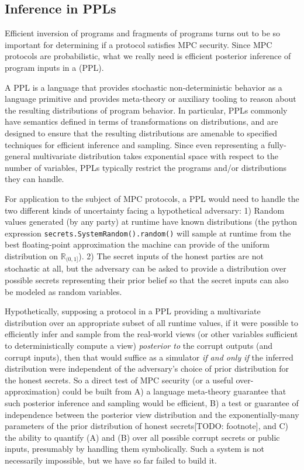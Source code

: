 \documentclass[conference]{IEEEtran}
\begin{document}
\subsection{Inference in PPLs}

Efficient inversion of programs and fragments of programs turns out to be so important for determining if a protocol satisfies MPC security.
Since MPC protocols are probabilistic, what we really need is efficient posterior inference of program inputs in a
 (PPL).

A PPL is a language that provides stochastic non-deterministic behavior as a language primitive
and provides meta-theory or auxiliary tooling to reason about the resulting distributions of program behavior.
In particular, PPLs commonly have semantics defined in terms of transformations on distributions,
and are designed to ensure that the resulting distributions are amenable to specified techniques for efficient
inference and sampling. Since even representing a fully-general multivariate distribution takes exponential space with respect to the number of variables,
PPLs typically restrict the programs and/or distributions they can handle.

For application to the subject of MPC protocols, a PPL would need to handle the two different kinds of uncertainty facing a hypothetical adversary:
1) Random values generated (by any party) at runtime have known distributions
(\eg the python expression \texttt{secrets.SystemRandom().random()}
will sample at runtime from the best floating-point approximation the machine can provide
of the uniform distribution on $\mathbb{R}_{(0,1]}$).
2) The secret inputs of the honest parties are not stochastic at all, but the adversary can be asked to provide a distribution over
possible secrets representing their prior belief so that the secret inputs can also be modeled as random variables.

Hypothetically, supposing a protocol in a PPL providing a multivariate distribution over an appropriate subset of all runtime values,
if it were possible to efficiently infer and sample from the real-world views
(or other variables sufficient to deterministically compute a view)
\textit{posterior to} the corrupt outputs (and corrupt inputs),
then that would suffice as a simulator
\textit{if and only if} the inferred distribution were independent of the adversary's choice of prior distribution for the honest secrets.
So a direct test of MPC security (or a useful over-approximation) could be built from
A) a language meta-theory guarantee that such posterior inference and sampling would be efficient,
B) a test or guarantee of independence between the posterior view distribution and the exponentially-many parameters
of the prior distribution of honest secrets[TODO: footnote], and
C) the ability to quantify (A) and (B) over all possible corrupt secrets or public inputs, presumably by handling them symbolically.
Such a system is not necessarily impossible, but we have so far failed to build it.
\end{document}

